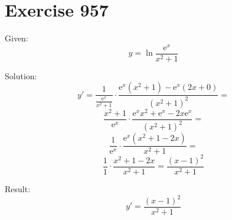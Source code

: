 \documentclass[a4paper, 10pt]{scrartcl}
\newcommand*\euler{\mathrm{e}}
\begin{document}
\section{Exercise 957}

Given:
\[
y = \ln{\frac{\euler^{x}}{x^{2} + 1}}
\]

Solution:
\[
y' = \frac{1}{\frac{\euler^{x}}{x^{2} + 1}}\cdot\frac{\euler^{x}(x^{2} + 1) - \euler^{x}(2x + 0)}{(x^{2} + 1)^{2}} =
\]
\[
\frac{x^{2} + 1}{\euler^{x}}\cdot\frac{\euler^{x}x^{2} + \euler^{x} - 2x\euler^{x}}{(x^{2} + 1)^{2}} =
\]
\[
\frac{1}{\euler^{x}}\cdot\frac{\euler^{x}(x^{2} + 1 - 2x)}{x^{2} + 1} =
\]
\[
\frac{1}{1}\cdot\frac{x^{2} + 1 - 2x}{x^{2} + 1} = \frac{(x - 1)^{2}}{x^{2} + 1}
\]

Result:
\[
y' = \frac{(x - 1)^{2}}{x^{2} + 1}
\]
\end{document}
